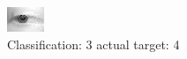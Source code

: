 \begin{figure}[h!]
\begin{center}
\includegraphics[width=0.60\columnwidth]{figures/ID2678_class_3_target_4.png}
\end{center}
\caption{ Classification: 3 actual target: 4}
\label{fig:ID2678_class_3_target_4}
\end{figure}
